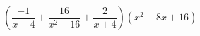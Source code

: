 \begin{ex}[type=expression]
	\begin{condition}
		\(\left( \dfrac{-1}{x-4}+\dfrac{16}{x^2-16}+\dfrac{2}{x+4} \right)(x^2-8x+16)\)
	\end{condition}
\end{ex}
